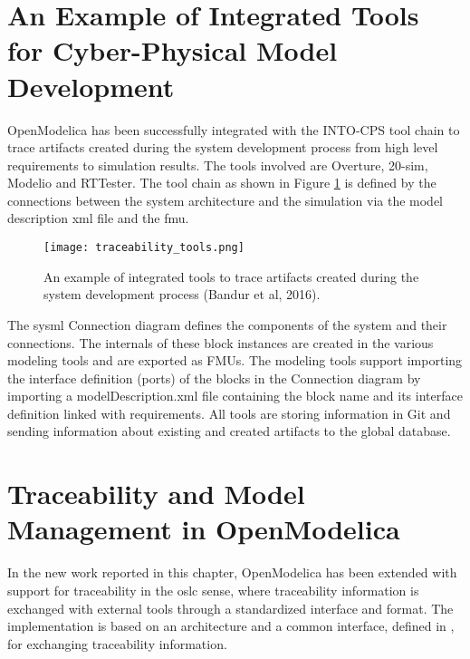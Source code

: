 \section{An Example of Integrated Tools for Cyber-Physical Model Development}
\label{sec:tracaebilitytools}

OpenModelica has been successfully integrated with the INTO-CPS tool chain to trace artifacts created
during the system development process from high level requirements to simulation results. The tools involved
are Overture, 20-sim, Modelio and RTTester. The tool chain as shown in Figure \ref{fig:traceabilitytools} is defined by the connections between the system architecture and the simulation via the model description \acrshort{xml} file and the \acrshort{fmu}.

\begin{landscape}
	\begin{figure}
		\texttt{[image: traceability\_tools.png]}
		\caption{An example of integrated tools to trace artifacts created during the system development process (Bandur et al, 2016).}
		\label{fig:traceabilitytools}
	\end{figure}
\end{landscape}

The \acrshort{sysml} Connection diagram defines the components of the system and their connections. The
internals of these block instances are created in the various modeling tools and are exported as FMUs. 
The modeling tools support importing the interface definition (ports) of the blocks in the Connection
diagram by importing a modelDescription.xml file containing the block name and its interface definition
linked with requirements. All tools are storing information in Git and sending information about
existing and created artifacts to the global database.

\section{Traceability and Model Management in OpenModelica}
\label{sec:tracaebilityactivities}

In the new work reported in this chapter, OpenModelica has been extended with support for traceability in the \acrshort{oslc} sense, 
where traceability information is exchanged with external tools through a standardized interface and format. The implementation is based on
an architecture and a common interface, defined in \cite{intocpskenneth}, for exchanging traceability information. 

